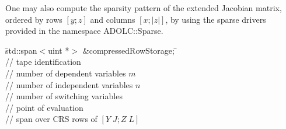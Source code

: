 One may also compute the sparsity pattern of the extended Jacobian
matrix, ordered by rows $[y;z]$ and columns $[x;|z|]$, by using the sparse drivers
 provided in the namespace {\sf ADOLC::Sparse}.

\begin{tabbing}
\hspace{0.5in}\={\sf std::span$<$uint *$>$ \&compressedRowStorage;} \hspace{0.6in}\= \kill    %
\\
         \> // tape identification \\
                 \> // number of dependent variables $m$\\
                 \> // number of independent variables $n$\\
                 \> // number of switching variables\\
       \> // point of evaluation\\     
 \> // span over CRS rows of $[Y\;J;Z\;L]$ \\
\end{tabbing}

